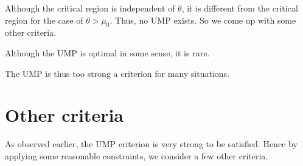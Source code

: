 \documentclass[a4paper,english,12pt]{article}
\begin{document}
\begin{rem}
Although the critical region is independent of $\theta$, it is different from the critical region for the case of $\theta > \mu_0$. Thus, no UMP exists. So we come up with some other criteria.
\end{rem}
\begin{rem}
Although the UMP is optimal in some sense, it is rare.
\end{rem}
\begin{rem}
The UMP is thus too strong a criterion for many situations.
\end{rem}

\section*{Other criteria}
As observed earlier, the UMP criterion is very strong to be satisfied. Hence by applying some reasonable constraints, we consider a few other criteria.
\end{document}
